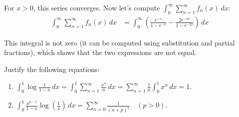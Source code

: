 For $x > 0$, this series converges. Now let's compute $\int_{0}^{\infty} \sum_{n=1}^{\infty} f_n(x) \, dx$:
\begin{align*}
\int_{0}^{\infty} \sum_{n=1}^{\infty} f_n(x) \, dx &= \int_{0}^{\infty} \left(\frac{e^{-x}}{1 - e^{-x}} - \frac{2e^{-2x}}{1 - e^{-2x}}\right) \, dx
\end{align*}

This integral is not zero (it can be computed using substitution and partial fractions), which shows that the two expressions are not equal.

\begin{problembox}
Justify the following equations:
\begin{enumerate}[label=(\alph*)]
    \item $\int_{0}^{1} \log \frac{1}{1-x} \, dx = \int_{0}^{1} \sum_{n=1}^{\infty} \frac{x^n}{n} \, dx = \sum_{n=1}^{\infty} \frac{1}{n} \int_{0}^{1} x^n \, dx = 1.$
    \item $\int_{0}^{1} \frac{x^{p-1}}{1-x} \log \left( \frac{1}{x} \right) \, dx = \sum_{n=0}^{\infty} \frac{1}{(n+p)^2} \quad (p > 0).$
\end{enumerate}
\end{problembox}

